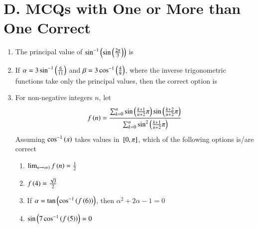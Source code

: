 \documentclass[journal,12pt,onecolumn,article]{IEEEtran}
\theoremstyle{remark}
\begin{document}
\section*{D. MCQs with One or More than One Correct}
\begin{enumerate}
\item The principal value of $\sin ^{-1}\left(\sin \left(\frac{2\pi}{3}\right)\right)$ is
\hfill {}
\begin{enumerate}
\end{enumerate}
\item If $\alpha=3\sin ^{-1}\left(\frac{6}{11}\right)$ and $\beta=3\cos ^{-1}\left(\frac{4}{9}\right)$, where the inverse trigonometric functions take only the principal values, then the correct option is
\hfill {}
\begin{enumerate}
\end{enumerate}
\item For non-negative integers $n$, let 
\begin{align*}
f\left(n\right)= \frac{\sum_{k=0}^{n} \sin \left(\frac{k+1}{n+2}\pi\right)\sin \left(\frac{k+2}{n+2}\pi\right)}{\sum_{k=0}^{n} \sin ^2 \left(\frac{k+1}{n+2}\pi\right)}
\end{align*}
Assuming $\cos ^{-1}\left(x\right)$ takes values in ${}\left[0,\pi\right]$, which of the following options is/are correct
\hfill {}
\begin{enumerate}
\item $\lim_{n \rightarrow \infty)} f\left(n\right) = \frac{1}{2}$ 
\item $f\left(4\right)=\frac{\sqrt{3}}{2}$
\item If $\alpha = \tan \left(\cos ^{-1}\left(f\left(6\right)\right)\right)$, then $\alpha ^2 + 2\alpha -1 =0$
\item $\sin \left(7\cos ^{-1}\left(f\left(5\right)\right)\right)=0$
\end{enumerate}
\end{enumerate}
\end{document}
